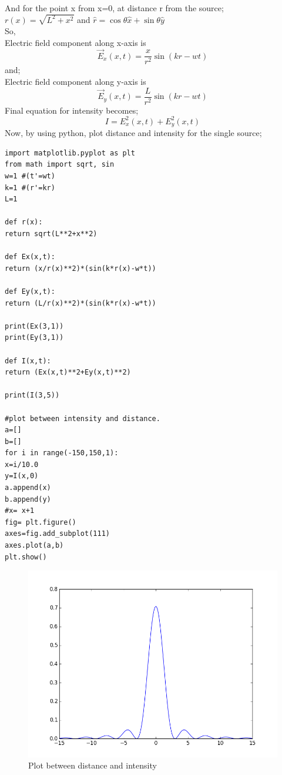 And for the point x from x=0, at distance r from the source;\\
$r(x) = \sqrt{L^2+x^2}$ and $\hat{r} = \cos\theta\hat{x}+\sin\theta\hat{y}$\\
So,\\
Electric field component along x-axis is\\
\begin{equation}
\vec{E}_x(x,t) = \frac{x}{r^2}\sin(kr-wt)
\end{equation}
and;\\
Electric field component along y-axis is\\
\begin{equation}
\vec{E}_y(x,t) = \frac{L}{r^2}\sin(kr-wt)
\end{equation}
Final equation for intensity becomes;\\
\begin{equation}
I = E_x^2(x,t)+E_y^2(x,t)
\end{equation}
Now, by using python, plot distance and intensity for the single source;\\
\begin{verbatim}
import matplotlib.pyplot as plt
from math import sqrt, sin
w=1 #(t'=wt)
k=1 #(r'=kr)
L=1

def r(x):
return sqrt(L**2+x**2)

def Ex(x,t):
return (x/r(x)**2)*(sin(k*r(x)-w*t))

def Ey(x,t):
return (L/r(x)**2)*(sin(k*r(x)-w*t))

print(Ex(3,1))
print(Ey(3,1))

def I(x,t):
return (Ex(x,t)**2+Ey(x,t)**2)

print(I(3,5))

#plot between intensity and distance.
a=[]
b=[]
for i in range(-150,150,1):
x=i/10.0
y=I(x,0)
a.append(x)
b.append(y)
#x= x+1
fig= plt.figure()
axes=fig.add_subplot(111)
axes.plot(a,b)
plt.show()
\end{verbatim}

\begin{figure}[ht]
\centering	
\includegraphics[scale=0.45]{figure_1.png}
\caption{Plot between distance and intensity}
\end{figure}

